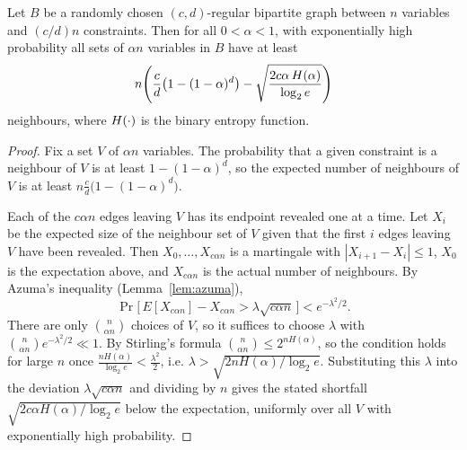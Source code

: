 \begin{theorem}[Theorem 26 (= Proposition 1): expansion of random graphs]
  \label{thm:expansion-random}
  Let $B$ be a randomly chosen $(c,d)$-regular bipartite graph between $n$
  variables and $(c/d)n$ constraints. Then for all $0<\alpha<1$, with
  exponentially high probability all sets of $\alpha n$ variables in $B$ have at
  least
  \[
    n\!\left(\frac{c}{d}\bigl(1-(1-\alpha)^d\bigr)
      - \sqrt{\frac{2c\alpha\,H(\alpha)}{\log_2 e}}\right)
  \]
  neighbours, where $H(\cdot)$ is the binary entropy function.
\end{theorem}
\begin{proof}
  Fix a set $V$ of $\alpha n$ variables. The probability that a given constraint
  is a neighbour of $V$ is at least $1-(1-\alpha)^d$, so the expected number of
  neighbours of $V$ is at least $n\frac{c}{d}\bigl(1-(1-\alpha)^d\bigr)$.

  Each of the $c\alpha n$ edges leaving $V$ has its endpoint revealed one at a
  time. Let $X_i$ be the expected size of the neighbour set of $V$ given that
  the first $i$ edges leaving $V$ have been revealed. Then
  $X_0,\dots,X_{c\alpha n}$ is a martingale with $|X_{i+1}-X_i|\le 1$, $X_0$ is
  the expectation above, and $X_{c\alpha n}$ is the actual number of neighbours.
  By Azuma's inequality (Lemma~\ref{lem:azuma}),
  \[
    \Pr\bigl[\,E[X_{c\alpha n}] - X_{c\alpha n} > \lambda\sqrt{c\alpha n}\,\bigr]
      < e^{-\lambda^2/2}.
  \]
  There are only $\binom{n}{\alpha n}$ choices of $V$, so it suffices to choose
  $\lambda$ with $\binom{n}{\alpha n}e^{-\lambda^2/2}\ll 1$. By Stirling's
  formula $\binom{n}{\alpha n}\le 2^{nH(\alpha)}$, so the condition holds for
  large $n$ once $\frac{nH(\alpha)}{\log_2 e}<\frac{\lambda^2}{2}$, i.e.
  $\lambda > \sqrt{2nH(\alpha)/\log_2 e}$. Substituting this $\lambda$ into the
  deviation $\lambda\sqrt{c\alpha n}$ and dividing by $n$ gives the stated
  shortfall $\sqrt{2c\alpha H(\alpha)/\log_2 e}$ below the expectation, uniformly
  over all $V$ with exponentially high probability.
\end{proof}
